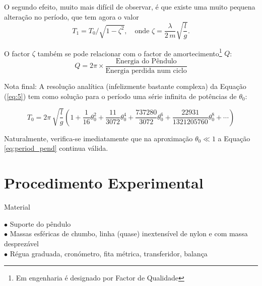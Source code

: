 \documentclass[a4paper,twoside,12pt]{article}      %
\begin{document}
O segundo efeito, muito mais difícil de observar, é que existe uma muito pequena alteração no período, que tem agora o valor
\begin{equation}
T_1= T_0 / \sqrt{1 - \zeta^2}, \quad \text{onde }  \zeta = \frac{\lambda}{2\, m} \sqrt{\frac{l}{g}} .
\end{equation}



O factor  $ \zeta $ também se pode relacionar com o factor de amortecimento\footnote{Em engenharia é designado por Factor de Qualidade} $Q$:
\begin{equation}
Q = 2 \pi \times \frac{\text{Energia do Pêndulo}}{\text{Energia perdida num ciclo}}
\end{equation}

Nota final: 
A resolução analítica (infelizmente bastante complexa) da Equação 	(\ref{eq:5})  tem como solução para o período uma série  infinita de potências de $\theta_0$:

\begin{equation}
	\label{eq:period_pend_exa}
T_0 =  2\pi\, \sqrt{\frac{l}{g}} \left(1 + \frac{1}{16} \theta_0^{2} + \frac{11}{3072} \theta_0^{4} +
 \frac{737280}{3072} \theta_0^{6} + \frac{22931}{1321205760} \theta_0^{8} + \cdots \right)
\end{equation}

Naturalmente, verifica-se imediatamente que na aproximação $\theta_0 \ll 1$ a Equação \ref{eq:period_pend} continua válida.




\newpage
\section{\sf Procedimento Experimental}
{ \large Material }
 \begin{flushleft}
	 $\bullet$ Suporte do pêndulo \\
	 $\bullet$ Massas esféricas de chumbo, linha (quase) inextensível de nylon e com massa desprezável \\
	 $\bullet$ Régua graduada, cronómetro, fita métrica, transferidor, balança
\end{flushleft} 
\end{document}
